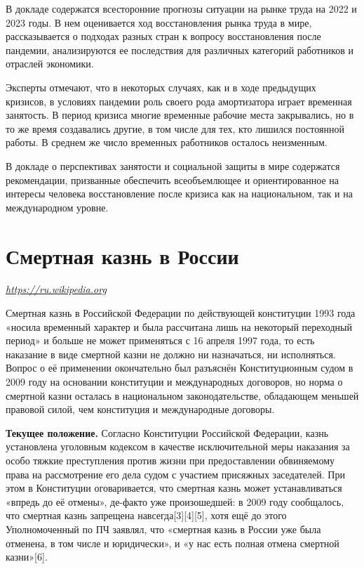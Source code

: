 В докладе содержатся всесторонние прогнозы ситуации на рынке труда на 2022 и 2023 годы. В нем оценивается ход восстановления рынка труда в мире, рассказывается о подходах разных стран к вопросу восстановления после пандемии, анализируются ее последствия для различных категорий работников и отраслей экономики.

Эксперты отмечают, что в некоторых случаях, как и в ходе предыдущих кризисов, в условиях пандемии роль своего рода амортизатора играет временная занятость. В период кризиса многие временные рабочие места закрывались, но в то же время создавались другие, в том числе для тех, кто лишился постоянной работы. В среднем же число временных работников осталось неизменным.

В докладе о перспективах занятости и социальной защиты в мире содержатся рекомендации, призванные обеспечить всеобъемлющее и ориентированное на интересы человека восстановление после кризиса как на национальном, так и на международном уровне.


\clearpage


\section{Смертная казнь в России}

 {\it \url{https://ru.wikipedia.org}}

Смертная казнь в Российской Федерации по действующей конституции 1993 года «носила временный характер и была рассчитана лишь на некоторый переходный период» и больше не может применяться с 16 апреля 1997 года, то есть наказание в виде смертной казни не должно ни назначаться, ни исполняться. Вопрос о её применении окончательно был разъяснён Конституционным судом в 2009 году на основании конституции и международных договоров, но норма о смертной казни осталась в национальном законодательстве, обладающем меньшей правовой силой, чем конституция и международные договоры.

\textbf{Текущее положение.} Согласно Конституции Российской Федерации, казнь установлена уголовным кодексом в качестве исключительной меры наказания за особо тяжкие преступления против жизни при предоставлении обвиняемому права на рассмотрение его дела судом с участием присяжных заседателей. При этом в Конституции оговаривается, что смертная казнь может устанавливаться «впредь до её отмены», де-факто уже произошедшей: в 2009 году сообщалось, что смертная казнь запрещена навсегда[3][4][5], хотя ещё до этого Уполномоченный по ПЧ заявлял, что «смертная казнь в России уже была отменена, в том числе и юридически», и «у нас есть полная отмена смертной казни»[6].

